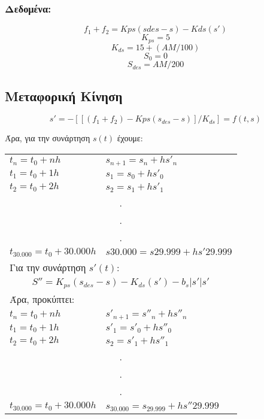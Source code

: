 \documentclass[a4paper]{article}
\begin{document}
        \subsubsection{Δεδομένα:}
            \[f_1 + f_2 = Kps (sdes - s) - Kds (s')\]
            \[K_{ps} = 5\]
            \[K_{ds} = 15 + (AM/ 100)\]
            \[S_0 =0\]
            \[S_{des} = AM / 200\]

        \subsection{Μεταφορική Κίνηση}

        \[s' = - [ [ (f_1 + f_2 ) - Kps (s_{des} - s) ]/ K_{ds} ] = f(t,s)\]

        Άρα, για την συνάρτηση $s(t)$ έχουμε:
        
        \begin{tabular}{ll}
            $t_n = t_0 + nh$		&			$s_{n+1} = s_n  + hs'_n$ \\
            $t_1 = t_0  + 1h$			&		   $s_1    = s_0  + hs'_0$ \\
            $t_2 = t_0  + 2h$			&		   $s_2    = s_1  + hs'_1$ \\
            \multicolumn{2}{c}{.}\\
            \multicolumn{2}{c}{.}\\
            \multicolumn{2}{c}{.}\\
            $t_{30.000} = t_0 + 30.000h$&			    $s30.000 = s29.999 + hs'29.999$\\
            \multicolumn{2}{l}{Για την συνάρτηση $s'(t)$:}\\
            \multicolumn{2}{c}{$S''	= K_{ps}(s_{des} - s) - K_{ds}(s') - b_s|s'|s'$}\\
            \multicolumn{2}{l}{Άρα, προκύπτει:}\\
            $t_n = t_0 + nh$		&			$s'_{n+1} = s''_n  + hs''_n$\\
            $t_1 = t_0  + 1h$			&		   $s'_1    = s'_0  + hs''_0$\\
            $t_2 = t_0  + 2h$			&		   $s_2    = s'_1  + hs''_1$\\
            \multicolumn{2}{c}{.}\\
            \multicolumn{2}{c}{.}\\
            \multicolumn{2}{c}{.}\\
            $t_{30.000} = t_0 + 30.000h$&			   $s_{30.000} = s_{29.999} + hs''29.999$
        \end{tabular}
\end{document}
